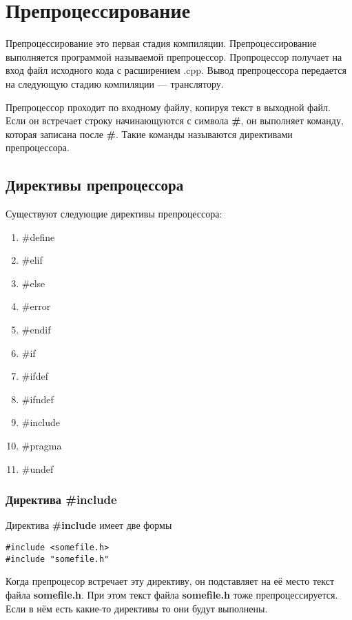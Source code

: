 \section{Препроцессирование}

Препроцессирование это первая стадия компиляции. Препроцессирование выполняется программой называемой препроцессор. Пропроцессор получает на вход файл исходного кода с расширением .cpp. Вывод препроцессора передается на следующую стадию компиляции --- транслятору.

Препроцессор проходит по входному файлу, копируя текст в выходной файл. Если он встречает строку начинающуются с символа {\bf \#}, он выполняет команду, которая записана после {\bf \#}. Такие команды называются директивами препроцессора.

\subsection{Директивы препроцессора}

Существуют следующие директивы препроцессора:
\begin{enumerate}
\item \#define
\item \#elif
\item \#else
\item \#error
\item \#endif
\item \#if
\item \#ifdef
\item \#ifndef
\item \#include
\item \#pragma
\item \#undef
\end{enumerate}

\subsubsection{Директива \#include}

Директива {\bf \#include} имеет две формы
\begin{verbatim}
#include <somefile.h>
#include "somefile.h"
\end{verbatim}

Когда препроцесор встречает эту директиву, он подставляет на её место текст файла {\bf somefile.h}. При этом текст файла {\bf somefile.h} тоже препроцессируется. Если в нём есть какие-то директивы то они будут выполнены.

